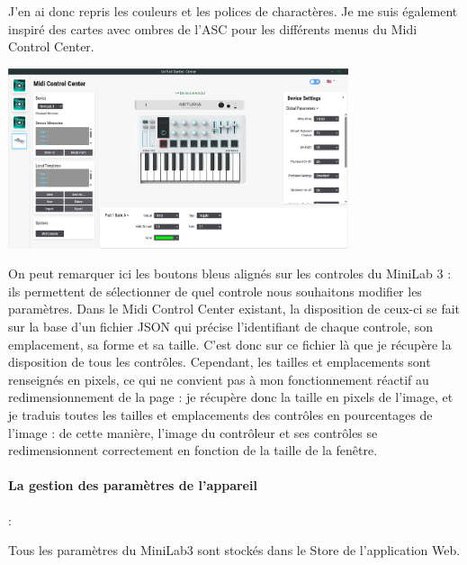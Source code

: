 \documentclass[francais]{rapportPFE}  %
\begin{document}
J'en ai donc repris les couleurs et les polices de charactères. Je me suis également inspiré des cartes avec ombres de l'ASC pour les différents menus du Midi Control Center.

\begin{center}
    \centering
    \includegraphics[width=10cm]{graphics/mcc_new.png}
    \label{fig:test1}
\end{center}

On peut remarquer ici les boutons bleus alignés sur les controles du MiniLab 3 : ils permettent de sélectionner de quel controle nous souhaitons modifier les paramètres. Dans le Midi Control Center existant, la disposition de ceux-ci se fait sur la base d'un fichier JSON qui précise l'identifiant de chaque controle, son emplacement, sa forme et sa taille. C'est donc sur ce fichier là que je récupère la disposition de tous les contrôles. Cependant, les tailles et emplacements sont renseignés en pixels, ce qui ne convient pas à mon fonctionnement réactif au redimensionnement de la page : je récupère donc la taille en pixels de l'image, et je traduis toutes les tailles et emplacements des contrôles en pourcentages de l'image : de cette manière, l'image du contrôleur et ses contrôles se redimensionnent correctement en fonction de la taille de la fenêtre.



\paragraph{La gestion des paramètres de l'appareil}:

Tous les paramètres du MiniLab3 sont stockés dans le Store de l'application Web.
\end{document}
